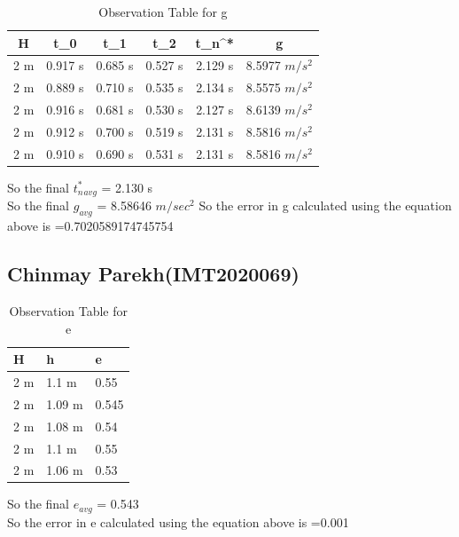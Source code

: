 \documentclass[11pt]{scrartcl} %
\begin{document}
\begin{table}[h]
\centering
\begin{tabular}{||c c c c c c||} 
\toprule
 \hline
 H & t_0 & t_1 & t_2 & t_n^* & g \\ [0.5ex] 
 \midrule
 \hline\hline
 2 m & 0.917 s & 0.685 s  & 0.527 s & 2.129 s & 8.5977 $m/s^2$  \\ 
 \hline
 2 m & 0.889 s & 0.710 s & 0.535 s & 2.134 s & 8.5575 $m/s^2$  \\
 \hline
 2 m & 0.916 s & 0.681 s & 0.530 s & 2.127 s  & 8.6139 $m/s^2$   \\
 \hline
 2 m & 0.912 s & 0.700 s & 0.519 s & 2.131 s  & 8.5816 $m/s^2$   \\
 \hline
 2 m & 0.910 s & 0.690 s & 0.531 s & 2.131 s  & 8.5816 $m/s^2$  \\ [1ex] 
 \bottomrule
 \hline
\end{tabular}
\caption{Observation Table for g}
\end{table}
So the final $t_n^*_{avg}$ = 2.130 s\\
So the final $g_{avg}$ = 8.58646 $m/sec^2$
So the error in g calculated using the equation above is =0.7020589174745754
\newpage
\subsection{Chinmay Parekh(IMT2020069)}

\begin{table}[h] %
	\centering %
	\begin{tabular}{l l l}
		\toprule
		\textbf{H} & \textbf{h} & \textbf{e} \\
		\midrule
		2 m & 1.1 m & 0.55\\
        2 m & 1.09 m  & 0.545\\
        2 m & 1.08 m  & 0.54\\
        2 m & 1.1 m & 0.55 \\
        2 m & 1.06 m & 0.53 \\
		\bottomrule
	\end{tabular}
	\caption{Observation Table for e}
\end{table}
So the final $e_{avg}$ = 0.543\\
So the error in e calculated using the equation above is =0.001
\end{document}
